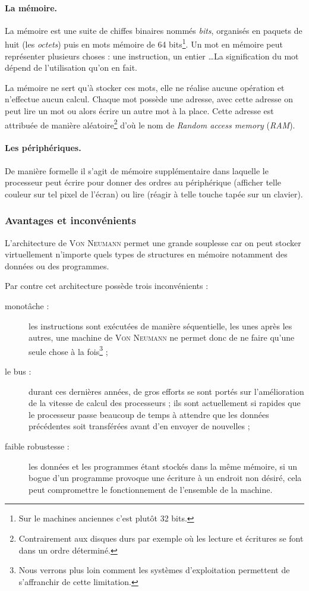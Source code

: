 \paragraph{La mémoire.}
La mémoire est une suite de chiffes binaires nommés \emph{bits}, organisés en paquets de huit (les \emph{octets}) puis en mots mémoire de 64 bits\footnote{Sur le machines anciennes c'est plutôt 32 bits.}. Un mot en mémoire peut représenter plusieurs choses : une instruction, un entier \dots La signification du mot dépend de l'utilisation qu'on en fait.\par
La mémoire ne sert qu'à stocker ces mots, elle ne réalise aucune opération et n'effectue aucun calcul. Chaque mot possède une adresse, avec cette adresse on peut lire un mot ou alors écrire un autre mot à la place. Cette adresse est attribuée de manière aléatoire\footnote{Contrairement aux disques durs par exemple où les lecture et écritures se font dans un ordre déterminé.} d'où le nom de \emph{Random access memory} (\emph{RAM}). 
\paragraph{Les périphériques.} De manière formelle il s'agit de mémoire supplémentaire dans laquelle le processeur peut écrire pour donner des ordres au périphérique (afficher telle couleur sur tel pixel de l'écran) ou lire (réagir à telle touche tapée sur un clavier).
\subsubsection{Avantages et inconvénients}
L'architecture de \textsc{Von Neumann} permet une grande souplesse car on peut stocker virtuellement n'importe quels types de structures en mémoire notamment des données ou des programmes.\par
Par contre cet architecture possède trois inconvénients :
\begin{description}
\item[monotâche :] les instructions sont exécutées de manière séquentielle, les unes après les autres, une machine de \textsc{Von Neumann} ne permet donc de ne faire qu'une seule chose à la fois\footnote{Nous verrons plus loin comment les systèmes d'exploitation permettent de s'affranchir de cette limitation.} ;
\item[le bus :] durant ces dernières années, de gros efforts se sont portés sur l'amélioration de la vitesse de calcul des processeurs ; ils sont actuellement si rapides que le processeur passe beaucoup de temps à attendre que les données précédentes soit transférées avant d'en envoyer de nouvelles ;
\item[faible robustesse :] les données et les programmes étant stockés dans la même mémoire, si un bogue d'un programme provoque une écriture à un endroit non désiré, cela peut compromettre le fonctionnement de l'ensemble de la machine.
\end{description}
